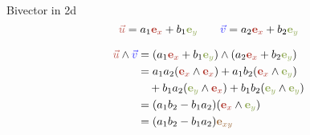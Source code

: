 \begin{frame}{Bivector in 2d}
    \Large
    \[
        \textcolor{u}{\vec{u}} = a_1 \textcolor{red}{\mathbf{e}_x} + b_1 \textcolor{green}{\mathbf{e}_y}
        \qquad
        \textcolor{v}{\vec{v}} = a_2 \textcolor{red}{\mathbf{e}_x} + b_2 \textcolor{green}{\mathbf{e}_y}
    \]

    \begin{align*}
        \textcolor{u}{\vec{u}} \wedge \textcolor{v}{\vec{v}}
         & = (a_1 \textcolor{red}{\mathbf{e}_x} + b_1 \textcolor{green}{\mathbf{e}_y}) \wedge (a_2 \textcolor{red}{\mathbf{e}_x} + b_2 \textcolor{green}{\mathbf{e}_y}) \\
         & = a_1 a_2 (\textcolor{red}{\mathbf{e}_x} \wedge \textcolor{red}{\mathbf{e}_x})
        + a_1 b_2 (\textcolor{red}{\mathbf{e}_x} \wedge \textcolor{green}{\mathbf{e}_y})                                                                                \\
         & \quad + b_1 a_2 (\textcolor{green}{\mathbf{e}_y} \wedge \textcolor{red}{\mathbf{e}_x})
        + b_1 b_2 (\textcolor{green}{\mathbf{e}_y} \wedge \textcolor{green}{\mathbf{e}_y})                                                                              \\
         & = (a_1 b_2 - b_1 a_2)(\textcolor{red}{\mathbf{e}_x} \wedge \textcolor{green}{\mathbf{e}_y})                                                                  \\
         & = (a_1 b_2 - b_1 a_2) \textcolor{midredgreen}{\mathbf{e}_{xy}}
    \end{align*}
\end{frame}


